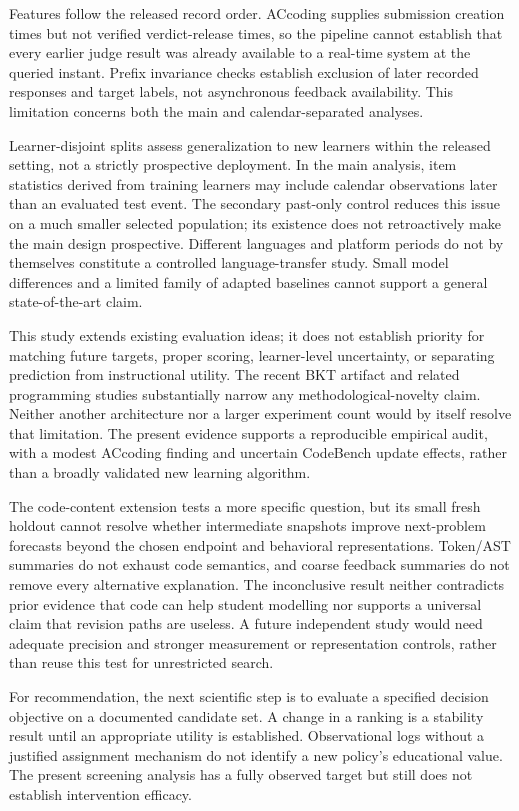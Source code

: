 \documentclass[11pt]{article}
\newcommand{\1}{\mathbb{I}}
\begin{document}
Features follow the released record order. ACcoding supplies submission creation times but not verified verdict-release times, so the pipeline cannot establish that every earlier judge result was already available to a real-time system at the queried instant. Prefix invariance checks establish exclusion of later recorded responses and target labels, not asynchronous feedback availability. This limitation concerns both the main and calendar-separated analyses.

Learner-disjoint splits assess generalization to new learners within the released setting, not a strictly prospective deployment. In the main analysis, item statistics derived from training learners may include calendar observations later than an evaluated test event. The secondary past-only control reduces this issue on a much smaller selected population; its existence does not retroactively make the main design prospective. Different languages and platform periods do not by themselves constitute a controlled language-transfer study. Small model differences and a limited family of adapted baselines cannot support a general state-of-the-art claim.

This study extends existing evaluation ideas; it does not establish priority for matching future targets, proper scoring, learner-level uncertainty, or separating prediction from instructional utility. The recent BKT artifact and related programming studies substantially narrow any methodological-novelty claim. Neither another architecture nor a larger experiment count would by itself resolve that limitation. The present evidence supports a reproducible empirical audit, with a modest ACcoding finding and uncertain CodeBench update effects, rather than a broadly validated new learning algorithm.

The code-content extension tests a more specific question, but its small fresh holdout cannot resolve whether intermediate snapshots improve next-problem forecasts beyond the chosen endpoint and behavioral representations. Token/AST summaries do not exhaust code semantics, and coarse feedback summaries do not remove every alternative explanation. The inconclusive result neither contradicts prior evidence that code can help student modelling nor supports a universal claim that revision paths are useless. A future independent study would need adequate precision and stronger measurement or representation controls, rather than reuse this test for unrestricted search.

For recommendation, the next scientific step is to evaluate a specified decision objective on a documented candidate set. A change in a ranking is a stability result until an appropriate utility is established. Observational logs without a justified assignment mechanism do not identify a new policy's educational value. The present screening analysis has a fully observed target but still does not establish intervention efficacy.
\end{document}
